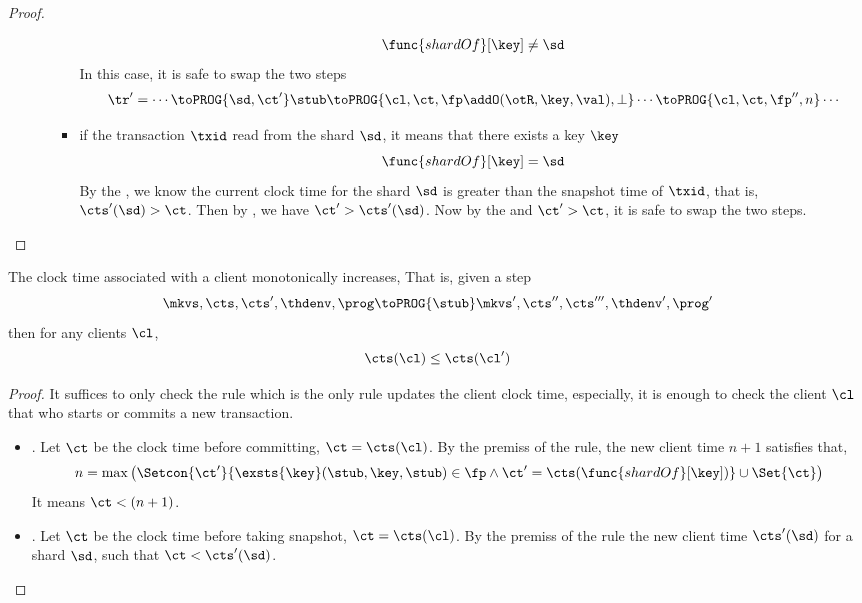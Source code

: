 \begin{proof}
\begin{itemize}
\begin{itemize}
\begin{itemize}
                \[
                    \func{shardOf}[\key] \neq \sd
                \]
            In this case, it is safe to swap the two steps
            \[
            \begin{array}{@{}l@{}}
            \tr' = \cdots \toPROG{\sd, \ct'} \stub \toPROG{\cl,\ct,\fp \addO (\otR, \key, \val),\perp} \cdots \toPROG{\cl,\ct,\fp'',n} \cdots \\
            \end{array}
            \]
            \item if the transaction \( \txid \) read from the shard \( \sd \), it means that there exists a key \( \key \)
            \[
                \func{shardOf}[\key] = \sd
            \]
            By the , we know the current clock time for the shard \( \sd \) is greater than the snapshot time of \( \txid \), 
            that is, \( \cts'(\sd) > \ct \).
            Then by ,  we have \( \ct' > \cts'(\sd) \).
            Now by the  and \( \ct' > \ct \), it is safe to swap the two steps.
        \end{itemize}
    \end{itemize}
    \end{itemize}
\end{proof}

\begin{lemma}
    \label{lem:mono-client-clock-time}
    The clock time associated with a client monotonically increases,
    That is, given a step
    \[
        \mkvs, \cts, \cts', \thdenv, \prog \toPROG{\stub} \mkvs', \cts'', \cts''', \thdenv', \prog'
    \]
    then for any clients \( \cl \),
    \[
        \cts(\cl) \leq \cts(\cl')
    \]
\end{lemma}
\begin{proof}
    It suffices to only check the  rule which is the only rule updates the client clock time,
    especially, it is enough to check the client \( \cl \) that who starts or commits a new transaction.
    \begin{itemize}
        \item {}.
            Let \( \ct \) be the clock time before committing, \( \ct = \cts(\cl)\).
            By the premiss of the rule, the new client time \( n + 1 \) satisfies that, 
            \[
                n = \max\left( \Setcon{\ct'}{\exsts{\key} (\stub, \key, \stub) \in \fp \land \ct' = \cts(\func{shardOf}[\key])} \cup \Set{\ct} \right)
            \]
            It means \( \ct < (n + 1)\).
        \item {}.
            Let \( \ct \) be the clock time before taking snapshot, \( \ct = \cts(\cl)\).
            By the premiss of the rule the new  client time \( \cts'(\sd) \) for a shard \( \sd \), 
            such that \( \ct < \cts'(\sd)  \).
    \end{itemize}
\end{proof}

